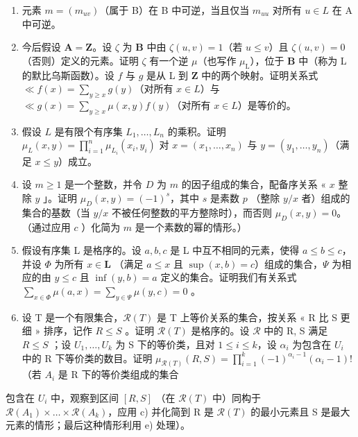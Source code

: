 \begin{enumerate}
\def\labelenumi{\alph{enumi})}
\item
  元素 \(m = (m_{uv})\)（属于 B）在 B 中可逆，当且仅当 \(m_{uu}\) 对所有 \(u \in L\) 在 A 中可逆。
\item
  今后假设 \(\mathbf{A} = \mathbf{Z}\)。设 \(\zeta\) 为 \(\mathbf{B}\) 中由 \(\zeta(u, v) = 1\)（若 \(u \leqslant v\)）且 \(\zeta(u, v) = 0\)（否则）定义的元素。证明 \(\zeta\) 有一个逆 \(\mu\)（也写作 \(\mu_{\mathrm{L}}\)），位于 \(\mathbf{B}\) 中（称为 L 的默比乌斯函数）。设 \(f\) 与 \(g\) 是从 L 到 \(\mathbf{Z}\) 中的两个映射。证明关系式 \(\ll f(x) = \sum_{y \geqslant x} g(y)\)（对所有 \(x \in L\)）与 \(\ll g(x) = \sum_{y \geqslant x} \mu(x, y) f(y)\)（对所有 \(x \in L\)）是等价的。
\item
  假设 \(L\) 是有限个有序集 \(L_1, \ldots, L_n\) 的乘积。证明 \(\mu_L(x, y) = \prod_{i=1}^{n} \mu_{L_i}(x_i, y_i)\) 对 \(x = (x_1, \ldots, x_n)\) 与 \(y = (y_1, \ldots, y_n)\)（满足 \(x \leqslant y\)）成立。
\item
  设 \(m \geqslant 1\) 是一个整数，并令 \(D\) 为 \(m\) 的因子组成的集合，配备序关系 « \(x\) 整除 \(y\) 」。证明 \(\mu_{D}(x, y) = (-1)^{s}\)，其中 \(s\) 是素数 \(p\) （整除 \(y/x\) 者）组成的集合的基数（当 \(y/x\) 不被任何整数的平方整除时），而否则 \(\mu_{D}(x, y) = 0\)。（通过应用 \(c\) ）化简为 \(m\) 是一个素数的幂的情形。）
\item
  假设有序集 L 是格序的。设 \(a, b, c\) 是 L 中互不相同的元素，使得 \(a \leqslant b \leqslant c\)，并设 \(\Phi\) 为所有 \(x \in \mathbf{L}\) （满足 \(a \leqslant x\) 且 \(\sup(x, b) = c\)）组成的集合，\(\Psi\) 为相应的由 \(y \leqslant c\) 且 \(\inf(y, b) = a\) 定义的集合。证明我们有关系式 \(\sum_{x \in \Phi} \mu(a, x) = \sum_{y \in \Psi} \mu(y, c) = 0\) 。
\item
  设 T 是一个有限集合，\(\mathcal{R}(T)\) 是 T 上等价关系的集合，按关系 « R 比 S 更细 » 排序，记作 \(R \leqslant S\) 。证明 \(\mathcal{R}(T)\) 是格序的。设 \(\mathcal{R}\) 中的 R, S 满足 \(R \leqslant S\) ；设 \(U_1, \ldots, U_k\) 为 S 下的等价类，且对 \(1 \leqslant i \leqslant k\)，设 \(\alpha_i\) 为包含在 \(U_i\) 中的 R 下等价类的数目。证明 \(\mu_{\mathcal{R}(T)}(R, S) = \prod_{i=1}^{k} (-1)^{\alpha_i - 1} (\alpha_i - 1)!\)（若 \(A_i\) 是 R 下的等价类组成的集合
\end{enumerate}

包含在 \(U_{i}\) 中，观察到区间 \([R, S]\) （在 \(\mathcal{R}(T)\) 中）同构于 \(\mathcal{R}(A_{1}) \times \ldots \times \mathcal{R}(A_{k})\)，应用 c) 并化简到 R 是 \(\mathcal{R}(T)\) 的最小元素且 S 是最大元素的情形；最后这种情形利用 e) 处理）。

